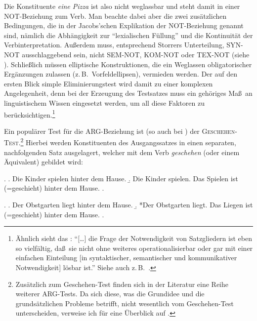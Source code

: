 Die Konstituente {\it eine Pizza} ist also nicht weglassbar und steht damit in einer NOT-Beziehung zum Verb. Man beachte dabei aber die zwei zusätzlichen Bedingungen, die in der Jacobs'schen Explikation der NOT-Beziehung genannt sind, nämlich die Abhängigkeit zur "`lexialischen Füllung"'  und die Kontinuität der Verb\-interpretation. Au\ss erdem muss, entsprechend Storrers Unterteilung, SYN-NOT ausschlaggebend sein, nicht SEM-NOT, KOM-NOT oder TEX-NOT (siehe \citealt[105]{Storrer:92}). Schlie\ss lich müssen elliptische Konstruktionen, die ein Weglassen obligatorischer Ergänzungen zulassen (z.\,B.\ Vorfeldellipsen), vermieden werden. Der auf den ersten Blick simple Eliminierungstest wird damit zu einer komplexen Angelegenheit, denn bei der Erzeugung des Testsatzes muss ein gehöriges Ma\ss \ an linguistischem Wissen eingesetzt werden, um all diese Faktoren zu berücksichtigen.\footnote{Ähnlich sieht das \citet[36f]{Heringer:84}: "`[\ldots] die Frage der Notwendigkeit von Satzgliedern ist eben so vielfältig, da\ss \ sie nicht ohne weiteres operationalisierbar oder gar mit einer einfachen Einteilung [in syntaktischer, semantischer und kommunikativer Notwendigkeit] lösbar ist."' Siehe auch z.\,B.\ \citet[226]{Vater:81}.} %

Ein populärer Test für die ARG-Beziehung ist (so auch bei \citealt[17f]{Jacobs:94}) der \textsc{Gesche\-hen-Test}.\footnote{Zusätzlich zum Geschehen-Test finden sich in der Literatur eine Reihe weiterer ARG-Tests. Da sich diese, was die Grundidee und die grundsätzlichen Probleme betrifft, nicht wesentlich vom Geschehen-Test unterscheiden, verweise ich für eine Überblick auf \citet[178]{Agel:00}.} Hierbei werden Konstituenten des Ausgangssatzes in einen separaten, nachfolgenden Satz ausgelagert, welcher mit dem Verb {\it geschehen} (oder einem Äquivalent) gebildet wird:

\ex. 
\a. Die Kinder spielen hinter dem Hause.
\b. Die Kinder spielen. Das Spielen ist (=geschieht) hinter dem Hause.
\z. \citep[63]{Storrer:92}

\ex. 
\a. Der Obstgarten liegt hinter dem Hause.
\b. *Der Obstgarten liegt. Das Liegen ist (=geschieht) hinter dem Hause.
\z. \citep[63]{Storrer:92}


